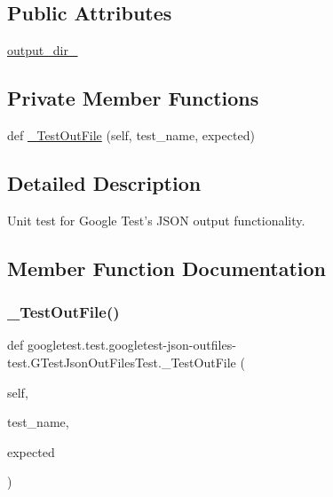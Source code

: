 \subsection*{Public Attributes}
\begin{DoxyCompactItemize}
\item 
\mbox{\hyperlink{classgoogletest_1_1test_1_1googletest-json-outfiles-test_1_1_g_test_json_out_files_test_a450ec2208d7e83e2a19d5dac06b54a95}{output\+\_\+dir\+\_\+}}
\end{DoxyCompactItemize}
\subsection*{Private Member Functions}
\begin{DoxyCompactItemize}
\item 
def \mbox{\hyperlink{classgoogletest_1_1test_1_1googletest-json-outfiles-test_1_1_g_test_json_out_files_test_a71c019636bf9995bc45b4fc81474ded9}{\+\_\+\+Test\+Out\+File}} (self, test\+\_\+name, expected)
\end{DoxyCompactItemize}


\subsection{Detailed Description}
\begin{DoxyVerb}Unit test for Google Test's JSON output functionality.\end{DoxyVerb}
 

\subsection{Member Function Documentation}
\mbox{\label{classgoogletest_1_1test_1_1googletest-json-outfiles-test_1_1_g_test_json_out_files_test_a71c019636bf9995bc45b4fc81474ded9}} 
\subsubsection{\texorpdfstring{\_TestOutFile()}{\_TestOutFile()}}
{\footnotesize\ttfamily def googletest.\+test.\+googletest-\/json-\/outfiles-\/test.\+G\+Test\+Json\+Out\+Files\+Test.\+\_\+\+Test\+Out\+File (\begin{DoxyParamCaption}\item[{}]{self,  }\item[{}]{test\+\_\+name,  }\item[{}]{expected }\end{DoxyParamCaption})\hspace{0.3cm}{\ttfamily [private]}}

